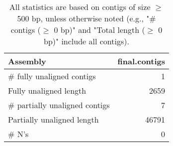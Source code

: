 \documentclass[12pt,a4paper]{article}
\begin{document}
\begin{table}[ht]
\begin{center}
\caption{All statistics are based on contigs of size $\geq$ 500 bp, unless otherwise noted (e.g., "\# contigs ($\geq$ 0 bp)" and "Total length ($\geq$ 0 bp)" include all contigs).}
\begin{tabular}{|l*{1}{|r}|}
\hline
Assembly & final.contigs \\ \hline
\# fully unaligned contigs & 1 \\ \hline
Fully unaligned length & 2659 \\ \hline
\# partially unaligned contigs & 7 \\ \hline
Partially unaligned length & 46791 \\ \hline
\# N's & 0 \\ \hline
\end{tabular}
\end{center}
\end{table}
\end{document}
